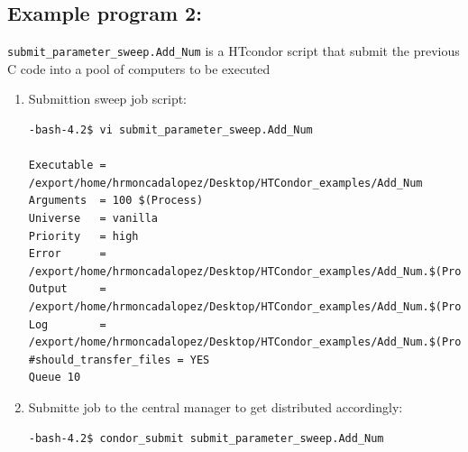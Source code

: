 \documentclass{article}
\begin{document}
\subsection{Example program 2:}  \verb+submit_parameter_sweep.Add_Num+  is a HTcondor script that submit the previous C code into a pool of computers to be executed
\begin{enumerate}
\item Submittion sweep job script:
\scriptsize\begin{verbatim}
-bash-4.2$ vi submit_parameter_sweep.Add_Num 

Executable =  /export/home/hrmoncadalopez/Desktop/HTCondor_examples/Add_Num
Arguments  = 100 $(Process)
Universe   = vanilla
Priority   = high
Error      = /export/home/hrmoncadalopez/Desktop/HTCondor_examples/Add_Num.$(Process).err
Output     = /export/home/hrmoncadalopez/Desktop/HTCondor_examples/Add_Num.$(Process).out
Log        = /export/home/hrmoncadalopez/Desktop/HTCondor_examples/Add_Num.$(Process).log
#should_transfer_files = YES
Queue 10
\end{verbatim}
\normalsize
\item Submitte job to the central manager to get distributed accordingly:
\scriptsize\begin{verbatim}
-bash-4.2$ condor_submit submit_parameter_sweep.Add_Num 


\end{verbatim}
\end{enumerate}
\end{document}
